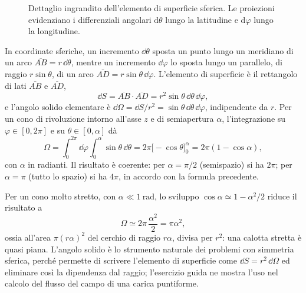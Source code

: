 \documentclass[main.tex]{subfiles}
\begin{document}
\begin{figure}[htbp]
	\caption{Dettaglio ingrandito dell'elemento di superficie sferica. Le proiezioni evidenziano i differenziali angolari $\mathrm{d}\theta$ lungo la latitudine e $\mathrm{d}\varphi$ lungo la longitudine.}
	\label{fig:pre:zoom_elemento_superficie}
\end{figure}

In coordinate sferiche, un incremento $\dd\theta$ sposta un punto lungo un meridiano di un arco $\overline{AB}=r\,\dd\theta$, mentre un incremento $\dd\varphi$ lo sposta lungo un parallelo, di raggio $r\sin\theta$, di un arco $\overline{AD}=r\sin\theta\,\dd\varphi$. L'elemento di superficie è il rettangolo di lati $\overline{AB}$ e $\overline{AD}$,
\[
\dd S=\overline{AB}\cdot\overline{AD}=r^2\sin\theta\,\dd\theta\,\dd\varphi ,
\]
e l'angolo solido elementare è $\dd\Omega=\dd S/r^2=\sin\theta\,\dd\theta\,\dd\varphi$, indipendente da $r$. Per un cono di rivoluzione intorno all'asse $z$ e di semiapertura $\alpha$, l'integrazione su $\varphi\in[0,2\pi]$ e su $\theta\in[0,\alpha]$ dà
\[
\Omega=\int_0^{2\pi}\dd\varphi\int_0^{\alpha}\sin\theta\,\dd\theta=2\pi\bigl[-\cos\theta\bigr]_0^{\alpha}=2\pi(1-\cos\alpha) ,
\]
con $\alpha$ in radianti. Il risultato è coerente: per $\alpha=\pi/2$ (semispazio) si ha $2\pi$; per $\alpha=\pi$ (tutto lo spazio) si ha $4\pi$, in accordo con la formula precedente.

Per un cono molto stretto, con $\alpha\ll1\ \mathrm{rad}$, lo sviluppo $\cos\alpha\simeq1-\alpha^2/2$ riduce il risultato a
\[
\Omega\simeq2\pi\,\frac{\alpha^2}{2}=\pi\alpha^2 ,
\]
ossia all'area $\pi(r\alpha)^2$ del cerchio di raggio $r\alpha$, divisa per $r^2$: una calotta stretta è quasi piana. L'angolo solido è lo strumento naturale dei problemi con simmetria sferica, perché permette di scrivere l'elemento di superficie come $\dd S=r^2\,\dd\Omega$ ed eliminare così la dipendenza dal raggio; l'esercizio guida ne mostra l'uso nel calcolo del flusso del campo di una carica puntiforme.
\end{document}
